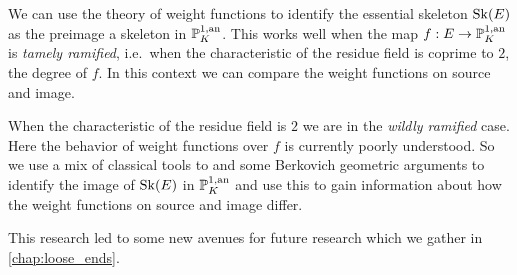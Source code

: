 We can use the theory of weight functions to identify the essential skeleton  $\operatorname{Sk}(E)$ as the preimage a skeleton in $\mathbb{P}^{1, \text{an}}_K$.
This works well when the map $f: E \to \mathbb{P}^{1, \text{an}}_K$ is \emph{tamely ramified}, i.e.\ when the characteristic of the residue field is coprime to $2$, the degree of $f$. 
In this context we can compare the weight functions on source and image. 

When the characteristic of the residue field is $2$ we are in the \emph{wildly ramified} case. 
Here the behavior of weight functions over $f$ is currently poorly understood. 
So we use a mix of classical tools to and some Berkovich geometric arguments to identify the image of  $\operatorname{Sk}(E)$ in $\mathbb{P}^{1, \text{an}}_K$ and use this to gain information about how the weight functions on source and image differ. 

This research led to some new avenues for future research which we gather in \cref{chap:loose_ends}.

